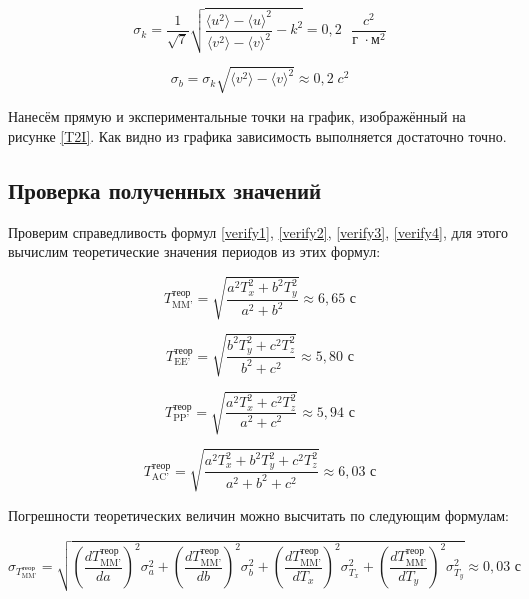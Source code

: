 \documentclass[a4paper,12pt]{article}
\begin{document}
\begin{equation}
    \sigma_k = \frac{1}{\sqrt{7}} \sqrt{\frac{\langle u^2 \rangle - \langle u \rangle^2}{\langle v^2 \rangle - \langle v \rangle^2} - k^2} = 0,2 \text{ } \frac{c^2}{\text{г } \cdot \text{м}^2}
\end{equation}

\begin{equation}
    \sigma_b = \sigma_k\sqrt{\langle v^2 \rangle - \langle v \rangle^2} \approx 0,2\; c^2
\end{equation}

Нанесём прямую и экспериментальные точки на график, изображённый на рисунке \ref{T2I}. Как видно из графика зависимость выполняется достаточно точно.

\subsection{Проверка полученных значений}

Проверим справедливость формул \eqref{verify1}, \eqref{verify2}, \eqref{verify3}, \eqref{verify4}, для этого вычислим теоретические значения периодов из этих формул:

\begin{equation}
    T_{\text{MM'}}^\text{теор} = \sqrt{\frac{a^2 T^2_{x}+b^2 T^2_{y}}{a^2+b^2}} \approx 6,65 \text{ с}
\end{equation}

\begin{equation}
    T_{\text{EE'}}^\text{теор} = \sqrt{\frac{b^2 T^2_{y}+c^2 T^2_{z}}{b^2+c^2}} \approx 5,80 \text{ с}
\end{equation}

\begin{equation}
    T_{\text{PP'}}^\text{теор} = \sqrt{\frac{a^2 T^2_{x}+c^2 T^2_{z}}{a^2+c^2}} \approx 5,94 \text{ с}
\end{equation}

\begin{equation}
    T_{\text{AC'}}^\text{теор} = \sqrt{\frac{a^2 T^2_{x}+b^2 T^2_{y}+c^2 T^2_{z}}{a^2+b^2+c^2}} \approx 6,03 \text{ с}
\end{equation}

Погрешности теоретических величин можно высчитать по следующим формулам:

\begin{equation}
    \sigma_{T_{\text{MM'}}^\text{теор}} = \sqrt{
    \left( \frac{dT_{\text{MM'}}^\text{теор}}{da} \right) ^ 2 \sigma_{a}^2 + 
    \left( \frac{dT_{\text{MM'}}^\text{теор}}{db} \right) ^ 2 \sigma_{b}^2 + 
    \left( \frac{dT_{\text{MM'}}^\text{теор}}{dT_{x}} \right) ^ 2 \sigma_{T_{x}}^2 + 
    \left( \frac{dT_{\text{MM'}}^\text{теор}}{dT_{y}} \right) ^ 2 \sigma_{T_{y}}^2
    } \approx 0,03 \text{ с}
\end{equation}
\end{document}
